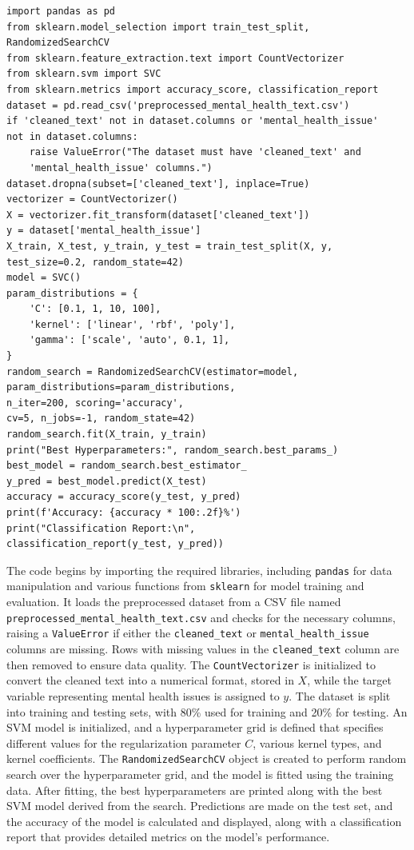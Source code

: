\begin{verbatim}
import pandas as pd
from sklearn.model_selection import train_test_split, 
RandomizedSearchCV
from sklearn.feature_extraction.text import CountVectorizer
from sklearn.svm import SVC
from sklearn.metrics import accuracy_score, classification_report
dataset = pd.read_csv('preprocessed_mental_health_text.csv')
if 'cleaned_text' not in dataset.columns or 'mental_health_issue'
not in dataset.columns:
    raise ValueError("The dataset must have 'cleaned_text' and 
    'mental_health_issue' columns.")
dataset.dropna(subset=['cleaned_text'], inplace=True)
vectorizer = CountVectorizer()
X = vectorizer.fit_transform(dataset['cleaned_text'])
y = dataset['mental_health_issue']
X_train, X_test, y_train, y_test = train_test_split(X, y, 
test_size=0.2, random_state=42)
model = SVC()
param_distributions = {
    'C': [0.1, 1, 10, 100],
    'kernel': ['linear', 'rbf', 'poly'],
    'gamma': ['scale', 'auto', 0.1, 1],
}
random_search = RandomizedSearchCV(estimator=model, 
param_distributions=param_distributions, 
n_iter=200, scoring='accuracy', 
cv=5, n_jobs=-1, random_state=42)
random_search.fit(X_train, y_train)
print("Best Hyperparameters:", random_search.best_params_)
best_model = random_search.best_estimator_
y_pred = best_model.predict(X_test)
accuracy = accuracy_score(y_test, y_pred)
print(f'Accuracy: {accuracy * 100:.2f}%')
print("Classification Report:\n", 
classification_report(y_test, y_pred))
\end{verbatim}

\noindent
The code begins by importing the required libraries, including \texttt{pandas} for data manipulation and various functions from \texttt{sklearn} for model training and evaluation. It loads the preprocessed dataset from a CSV file named \newline \texttt{preprocessed\_mental\_health\_text.csv} and checks for the necessary columns, raising a \texttt{ValueError} if either the \texttt{cleaned\_text} or \texttt{mental\_health\_issue} columns are missing. Rows with missing values in the \texttt{cleaned\_text} column are then removed to ensure data quality. The \texttt{CountVectorizer} is initialized to convert the cleaned text into a numerical format, stored in \(X\), while the target variable representing mental health issues is assigned to \(y\). The dataset is split into training and testing sets, with 80\% used for training and 20\% for testing. An SVM model is initialized, and a hyperparameter grid is defined that specifies different values for the regularization parameter \(C\), various kernel types, and kernel coefficients. The \texttt{RandomizedSearchCV} object is created to perform random search over the hyperparameter grid, and the model is fitted using the training data. After fitting, the best hyperparameters are printed along with the best SVM model derived from the search. Predictions are made on the test set, and the accuracy of the model is calculated and displayed, along with a classification report that provides detailed metrics on the model's performance.

